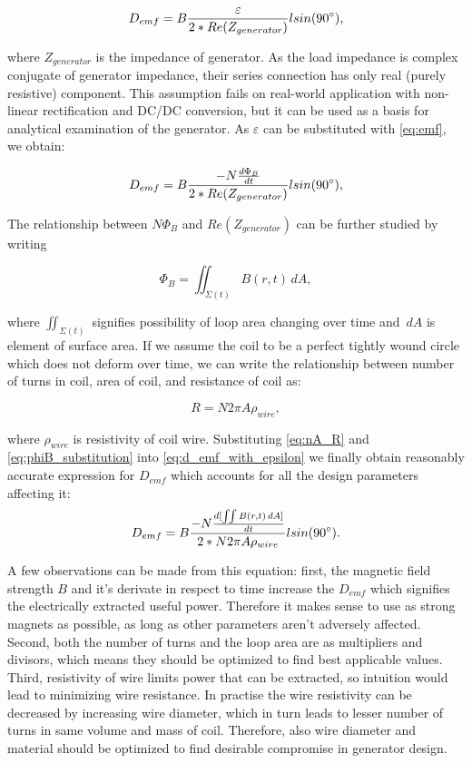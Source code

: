 \begin{equation}
  D_{emf} = B \frac{\varepsilon}{2*Re(Z_{generator})} l sin(90 \degree),
\end{equation}

where $Z_{generator}$ is the impedance of generator. As the load impedance is complex conjugate of generator impedance, their series connection has only real (purely resistive) component. This assumption fails on real-world application with non-linear rectification and DC/DC conversion, but it can be used as a basis for analytical examination of the generator. As $\varepsilon$ can be substituted with \eqref{eq:emf}, we obtain:

\begin{equation}\label{eq:d_emf_with_epsilon}
  D_{emf} = B \frac{-N \frac{d \Phi_{B}}{d t}}{2*Re(Z_{generator})} l sin(90 \degree),
\end{equation}

The relationship between $N \Phi_{B}$ and $Re(Z_{generator})$ can be further studied by writing 

\begin{equation}\label{eq:phiB_substitution}
  \Phi_{B} = \iint_{\Sigma (t)} B(r, t) \,dA,
\end{equation}

 where $ \iint_{\Sigma (t)} $ signifies possibility of loop area changing over time and $\,dA$ is element of surface area. If we assume the coil to be a perfect tightly wound circle which does not deform over time, we can write the relationship between number of turns in coil, area of coil, and resistance of coil as:

\begin{equation}\label{eq:nA_R}
  R = N 2\pi A \rho_{wire},
\end{equation}

where $\rho_{wire}$ is resistivity of coil wire. Substituting \eqref{eq:nA_R} and \eqref{eq:phiB_substitution} into \eqref{eq:d_emf_with_epsilon} we finally obtain reasonably accurate expression for $D_{emf}$ which accounts for all the design parameters affecting it:
\begin{equation}\label{eq:d_emf_complete}
  D_{emf} = B \frac{-N \frac{d [\iint B(r, t) \,dA]}{d t}}{2*N 2\pi A \rho_{wire}} l sin(90 \degree).
\end{equation}

A few observations can be made from this equation: first, the magnetic field strength $B$ and it's derivate in respect to time increase the $D_{emf}$ which signifies the electrically extracted useful power. Therefore it makes sense to use as strong magnets as possible, as long as other parameters aren't adversely affected. Second, both the number of turns and the loop area are as multipliers and divisors, which means  they should be optimized to find best applicable values. Third, resistivity of wire limits power that can be extracted, so intuition would lead to minimizing wire resistance. In practise the wire resistivity can be decreased by increasing wire diameter, which in turn leads to lesser number of turns in same volume and mass of coil. Therefore, also wire diameter and material should be optimized to find desirable compromise in generator design. 

